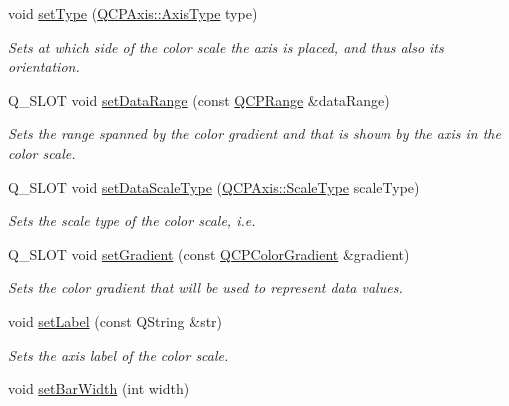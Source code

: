 \begin{DoxyCompactItemize}
\item 
void \hyperlink{classQCPColorScale_a1bf9bdb291927c422dd66b404b206f1f}{set\+Type} (\hyperlink{classQCPAxis_ae2bcc1728b382f10f064612b368bc18a}{Q\+C\+P\+Axis\+::\+Axis\+Type} type)
\begin{DoxyCompactList}\small\item\em Sets at which side of the color scale the axis is placed, and thus also its orientation. \end{DoxyCompactList}\item 
Q\+\_\+\+S\+L\+O\+T void \hyperlink{classQCPColorScale_abe88633003a26d1e756aa74984587fef}{set\+Data\+Range} (const \hyperlink{classQCPRange}{Q\+C\+P\+Range} \&data\+Range)
\begin{DoxyCompactList}\small\item\em Sets the range spanned by the color gradient and that is shown by the axis in the color scale. \end{DoxyCompactList}\item 
Q\+\_\+\+S\+L\+O\+T void \hyperlink{classQCPColorScale_aeb6107d67dd7325145b2498abae67fc3}{set\+Data\+Scale\+Type} (\hyperlink{classQCPAxis_a36d8e8658dbaa179bf2aeb973db2d6f0}{Q\+C\+P\+Axis\+::\+Scale\+Type} scale\+Type)
\begin{DoxyCompactList}\small\item\em Sets the scale type of the color scale, i.\+e. \end{DoxyCompactList}\item 
Q\+\_\+\+S\+L\+O\+T void \hyperlink{classQCPColorScale_a1f29583bb6f1e7f473b62fb712be3940}{set\+Gradient} (const \hyperlink{classQCPColorGradient}{Q\+C\+P\+Color\+Gradient} \&gradient)
\begin{DoxyCompactList}\small\item\em Sets the color gradient that will be used to represent data values. \end{DoxyCompactList}\item 
void \hyperlink{classQCPColorScale_aee124ae8396320cacf8276e9a0fbb8ce}{set\+Label} (const Q\+String \&str)
\begin{DoxyCompactList}\small\item\em Sets the axis label of the color scale. \end{DoxyCompactList}\item 
\hypertarget{classQCPColorScale_ab9dcc0c1cd583477496209b1413bcb99}{}void \hyperlink{classQCPColorScale_ab9dcc0c1cd583477496209b1413bcb99}{set\+Bar\+Width} (int width)\label{classQCPColorScale_ab9dcc0c1cd583477496209b1413bcb99}


\end{DoxyCompactItemize}
